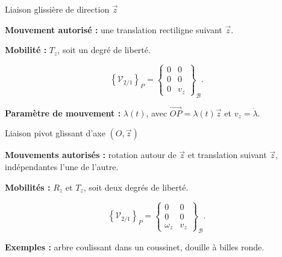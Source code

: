 \begin{TLLiaisonCard}{Liaison glissière de direction \(\vec z\)}
\begin{minipage}[c]{.18\linewidth}\centering
\TLSymGlissiere
\end{minipage}\hfill
\begin{minipage}[c]{.77\linewidth}
\textbf{Mouvement autorisé :} une translation rectiligne suivant \(\vec z\).

\textbf{Mobilité :} \(T_z\), soit un degré de liberté.

\[
\left\{\mathcal V_{2/1}\right\}_P=
\left\{\begin{array}{cc}
0&0\\0&0\\0&v_z
\end{array}\right\}_{\mathcal B}.
\]

\textbf{Paramètre de mouvement :} \(\lambda(t)\), avec
\(\vec{OP}=\lambda(t)\vec z\) et \(v_z=\dot\lambda\).
\end{minipage}
\end{TLLiaisonCard}

\begin{TLLiaisonCard}{Liaison pivot glissant d'axe \((O,\vec z)\)}
\begin{minipage}[c]{.18\linewidth}\centering
\TLSymPivotGlissant
\end{minipage}\hfill
\begin{minipage}[c]{.77\linewidth}
\textbf{Mouvements autorisés :} rotation autour de \(\vec z\) et translation
suivant \(\vec z\), indépendantes l'une de l'autre.

\textbf{Mobilités :} \(R_z\) et \(T_z\), soit deux degrés de liberté.

\[
\left\{\mathcal V_{2/1}\right\}_P=
\left\{\begin{array}{cc}
0&0\\0&0\\\omega_z&v_z
\end{array}\right\}_{\mathcal B}.
\]

\textbf{Exemples :} arbre coulissant dans un coussinet, douille à billes ronde.
\end{minipage}
\end{TLLiaisonCard}

